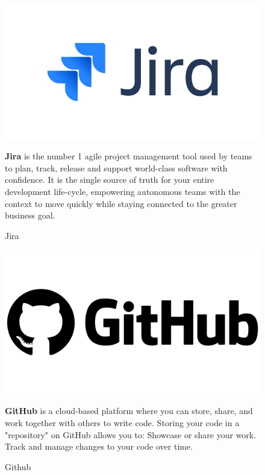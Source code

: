 \begin{figure}[h]
\centering
\begin{minipage}{0.3\textwidth}
    \centering
    \includegraphics[width=\linewidth,frame]{figures/jira logo.png}
    \caption{Jira}
\end{minipage}
\hfill
\begin{minipage}{0.6\textwidth}
\textbf{Jira} is the number 1 agile project management tool used by teams to plan, track, release and support world-class software with confidence. It is the single source of truth for your entire development life-cycle, empowering autonomous teams with the context to move quickly while staying connected to the greater business goal.\cite{samplewebs28}
\end{minipage}
\end{figure}

\begin{figure}[h]
\centering
\begin{minipage}{0.3\textwidth}
    \centering
    \includegraphics[width=\linewidth,frame]{figures/github.png}
    \caption{Github}
\end{minipage}
\hfill
\begin{minipage}{0.6\textwidth}
\textbf{GitHub} is a cloud-based platform where you can store, share, and work together with others to write code. Storing your code in a "repository" on GitHub allows you to: Showcase or share your work. Track and manage changes to your code over time.\cite{samplewebs29}
\end{minipage}
\end{figure}
\clearpage
